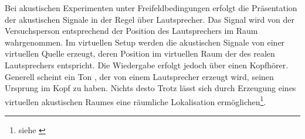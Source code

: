 

Bei akustischen Experimenten unter Freifeldbedingungen erfolgt die Präsentation der akustischen Signale in der Regel über Lautsprecher. Das Signal wird von der Versuchsperson entsprechend der Position des Lautsprechers im Raum wahrgenommen. Im virtuellen Setup werden die akustischen Signale von einer virtuellen Quelle erzeugt, deren Position im virtuellen Raum der des realen Lautsprechers entspricht. Die Wiedergabe erfolgt jedoch über einen Kopfhörer. Generell scheint ein Ton , der von einem Lautsprecher erzeugt wird, seinen Ursprung im Kopf zu haben. Nichts desto Trotz lässt sich durch Erzeugung eines virtuellen akustischen Raumes eine räumliche Lokalisation ermöglichen\footnote{siehe \cite{SLAS}}.
